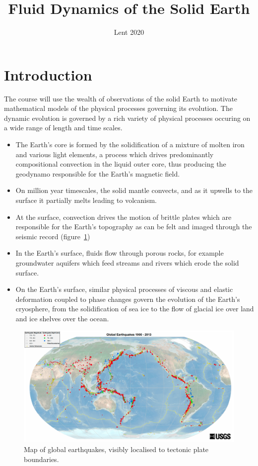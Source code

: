 \documentclass{jknotes}
\begin{document}
\title{Fluid Dynamics of the Solid Earth}
\date{Lent 2020}

\maketitle
\suggestionsspiel
\tableofcontents

\section{Introduction}
The course will use the wealth of observations of the solid Earth to motivate
mathematical models of the physical processes governing its evolution. The
dynamic evolution is governed by a rich variety of physical processes occuring
on a wide range of length and time scales. 

\begin{itemize}
	\item The Earth's core is formed by the solidification of a mixture of
		molten iron and various light elements, a process which drives
		predominantly compositional convection in the liquid outer core, thus
		producing the geodynamo responsible for the Earth's magnetic field. 
	\item On million year timescales, the solid mantle convects, and as it
		upwells to the surface it partially melts leading to volcanism. 
	\item At the surface, convection drives the motion of brittle plates which
		are responsible for the Earth's topography as can be felt and imaged
		through the seismic record (figure~\ref{fig:seismology})
	\item In the Earth's surface, fluids flow through porous rocks, for
		example groundwater aquifers which feed streams and rivers which erode
		the solid surface.
	\item On the Earth's surface, similar physical processes of viscous and
		elastic deformation coupled to phase changes govern the evolution of
		the Earth's cryosphere, from the solidification of sea ice to the flow
		of glacial ice over land and ice shelves over the ocean.
\end{itemize}
\begin{figure}
	\centering
	\includegraphics[width=\textwidth]{earthquakes.png}
	\caption{Map of global earthquakes, visibly localised to tectonic plate
	boundaries.}
	\label{fig:seismology}
\end{figure}
\end{document}

